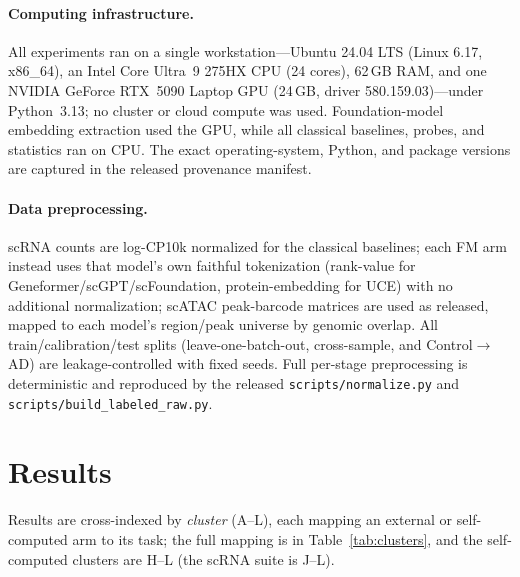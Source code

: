 \documentclass[fleqn,10pt,lineno]{wlpeerj}  %
\begin{document}
\paragraph{Computing infrastructure.} All experiments ran on a single workstation---Ubuntu 24.04 LTS (Linux 6.17, x86\_64), an Intel Core Ultra~9 275HX CPU (24 cores), 62\,GB RAM, and one NVIDIA GeForce RTX~5090 Laptop GPU (24\,GB, driver 580.159.03)---under Python~3.13; no cluster or cloud compute was used. Foundation-model embedding extraction used the GPU, while all classical baselines, probes, and statistics ran on CPU. The exact operating-system, Python, and package versions are captured in the released provenance manifest.

\paragraph{Data preprocessing.} scRNA counts are log-CP10k normalized for the classical baselines; each FM arm instead uses that model's own faithful tokenization (rank-value for Geneformer/scGPT/scFoundation, protein-embedding for UCE) with no additional normalization; scATAC peak-barcode matrices are used as released, mapped to each model's region/peak universe by genomic overlap. All train/calibration/test splits (leave-one-batch-out, cross-sample, and Control$\to$AD) are leakage-controlled with fixed seeds. Full per-stage preprocessing is deterministic and reproduced by the released \texttt{scripts/normalize.py} and \texttt{scripts/build\_labeled\_raw.py}.

\FloatBarrier
\section{Results}
\noindent Results are cross-indexed by \emph{cluster} (A--L), each mapping an external or self-computed arm to its task; the full mapping is in Table~\ref{tab:clusters}, and the self-computed clusters are H--L (the scRNA suite is J--L).
\end{document}
